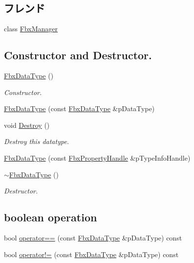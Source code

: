 \subsection*{フレンド}
\begin{DoxyCompactItemize}
\item 
class \hyperlink{class_fbx_data_type_aa6292f0d09535e3fe957088d09276268}{Fbx\+Manager}
\end{DoxyCompactItemize}
\subsection*{Constructor and Destructor.}
\begin{DoxyCompactItemize}
\item 
\hyperlink{class_fbx_data_type_a3441ba1df35e11f7598146731bc70d70}{Fbx\+Data\+Type} ()
\begin{DoxyCompactList}\small\item\em Constructor. \end{DoxyCompactList}\item 
\hyperlink{class_fbx_data_type_ae711414e8450866b24a0c879bf5c0166}{Fbx\+Data\+Type} (const \hyperlink{class_fbx_data_type}{Fbx\+Data\+Type} \&p\+Data\+Type)
\item 
void \hyperlink{class_fbx_data_type_a7c12ecf6b63f53fb6d9178ccd622eddd}{Destroy} ()
\begin{DoxyCompactList}\small\item\em Destroy this datatype. \end{DoxyCompactList}\item 
\hyperlink{class_fbx_data_type_a40dc7c9a1670c754e1e31394eabec7b7}{Fbx\+Data\+Type} (const \hyperlink{class_fbx_property_handle}{Fbx\+Property\+Handle} \&p\+Type\+Info\+Handle)
\item 
\hyperlink{class_fbx_data_type_aaad8ea35e6b315bd3346c453825183e1}{$\sim$\+Fbx\+Data\+Type} ()
\begin{DoxyCompactList}\small\item\em Destructor. \end{DoxyCompactList}\end{DoxyCompactItemize}
\subsection*{boolean operation}
\begin{DoxyCompactItemize}
\item 
bool \hyperlink{class_fbx_data_type_adb742e131aeab52ff8ca3bc095026e3d}{operator==} (const \hyperlink{class_fbx_data_type}{Fbx\+Data\+Type} \&p\+Data\+Type) const
\item 
bool \hyperlink{class_fbx_data_type_a219d626fd80822f8d1f45b59b4dd1837}{operator!=} (const \hyperlink{class_fbx_data_type}{Fbx\+Data\+Type} \&p\+Data\+Type) const
\end{DoxyCompactItemize}


